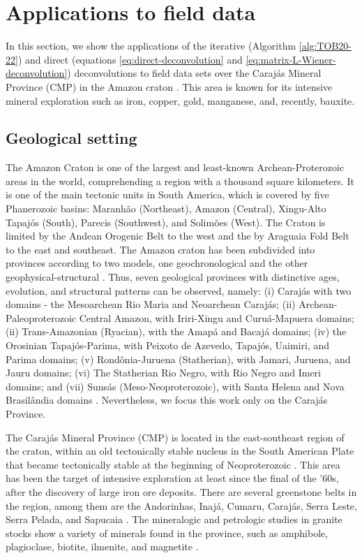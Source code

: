 \section{Applications to field data}
\label{sec:real_data}

In this section, we show the applications of the iterative (Algorithm \ref{alg:TOB20-22}) and direct 
(equations \ref{eq:direct-deconvolution} and \ref{eq:matrix-L-Wiener-deconvolution}) deconvolutions to field data sets 
over the Caraj{\'a}s Mineral Province (CMP) in the Amazon craton \citep{moroni-etal2001,villas-santos2001}. 
This area is known for its intensive mineral exploration such as iron, copper, gold, manganese, and, recently, bauxite.

\subsection{Geological setting}

The Amazon Craton is one of the largest and least-known Archean-Proterozoic areas in the world, comprehending a region with a thousand square kilometers. 
It is one of the main tectonic units in South America, which is covered by five Phanerozoic basins: 
Maranh{\~a}o (Northeast), Amazon (Central), Xingu-Alto Tapaj{\'o}s (South), Parecis (Southwest), and Solim{\~o}es (West). 
The Craton is limited by the Andean Orogenic Belt to the west and the by Araguaia Fold Belt to the east and southeast. 
The Amazon craton has been subdivided into provinces according to two models, one geochronological and the other geophysical-structural 
\citep{amaral1974, teixeira-etal1989, tassinari-macambira1999}. Thus, seven geological provinces with distinctive ages, evolution, and structural 
patterns can be observed, namely: (i) Caraj{\'a}s with two domains - the Mesoarchean Rio Maria and Neoarchean Caraj{\'a}s; 
(ii) Archean-Paleoproterozoic Central Amazon, with Iriri-Xingu and Curuá-Mapuera domains; (ii) Trans-Amazonian (Ryacian), with the Amap{\'a} 
and Bacaj{\'a} domains; (iv) the Orosinian Tapaj{\'o}s-Parima, with Peixoto de Azevedo, Tapaj{\'o}s, Uaimiri, and Parima domains; 
(v) Rond{\^o}nia-Juruena (Statherian), with Jamari, Juruena, and Jauru domains; (vi) The Statherian Rio Negro, with Rio Negro and 
Imeri domains; and (vii) Suns{\'a}s (Meso-Neoproterozoic), with Santa Helena and Nova Brasil{\^a}ndia domains \citep{santos-etal2000}. 
Nevertheless, we focus this work only on the Caraj{\'a}s Province. 

The Caraj{\'a}s Mineral Province (CMP) is located in the east-southeast region of the craton, within an old tectonically stable nucleus in the 
South American Plate that became tectonically stable at the beginning of Neoproterozoic \citep{salomao-etal2019}. 
This area has been the target of intensive exploration at least since the final of the '60s, after the discovery of large iron ore deposits. 
There are several greenstone belts in the region, among them are the Andorinhas, Inajá, Cumaru, Caraj{\'a}s, Serra Leste, Serra Pelada, and Sapucaia 
\citep{santos-etal2000}. The mineralogic and petrologic studies in granite stocks show a variety of minerals found in the province, such as 
amphibole, plagioclase, biotite, ilmenite, and magnetite \citep{cunha-etal2016}. 

